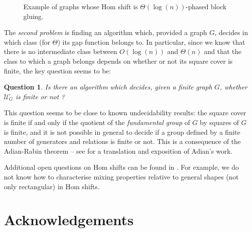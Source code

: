 \documentclass{article}
\newtheorem{question}[theorem]{Question}
\newcommand\quadcover[1]{\mathcal{U}^\square_{#1}}
\begin{document}
\begin{figure}[ht]
\begin{center}

\end{center}
\caption{Example of graphs 
whose Hom shift is $\Theta(\log(n))$-phased block gluing.
\label{figure.counterexample}}
\end{figure}

The \textit{second problem} is finding an algorithm which, 
provided a graph $G$, decides in which class (for $\Theta$) its gap function belongs to. In particular, since we know 
that there is no intermediate class between $O(\log(n))$ and $\Theta(n)$ and that the class to which a graph belongs depends on whether or not its square cover is finite, the key question seems to be:

\begin{question}
Is there an algorithm which decides, given a finite graph $G$, whether $\quadcover{G}$ is finite or not ?
\end{question}

This question seems to be close to known undecidability results: the square cover is finite if and only if the quotient of the \textit{fundamental group} of $G$ by squares of $G$ is finite, and it is not possible in general to decide if a group defined by a finite number of generators and relations is finite or not. This is a consequence of the Adian-Rabin theorem \cite{A57, R58} -- see \cite{NB22} for a translation and exposition of Adian's work.

Additional open questions on Hom shifts can be found in \cite{C17, CM18}. For example, we do not know how to characterise mixing properties relative to general shapes (not only rectangular) in Hom shifts.

\section*{Acknowledgements}
\end{document}
